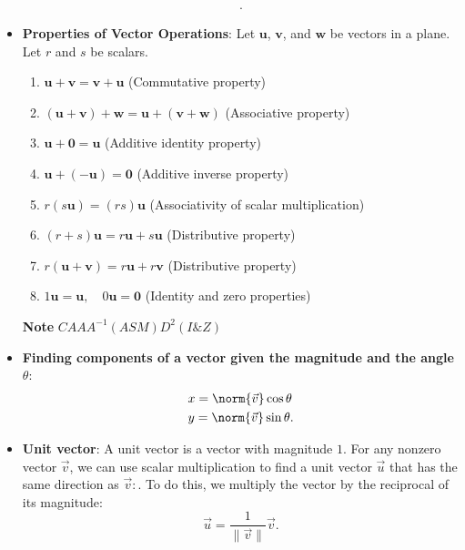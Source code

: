 \documentclass{report}
\begin{document}
\begin{itemize}
\begin{align*}
        .\end{align*}
    \item \textbf{Properties of Vector Operations}:
        Let $\mathbf{u}$, $\mathbf{v}$, and $\mathbf{w}$ be vectors in a plane. Let $r$ and $s$ be scalars.
        \begin{enumerate}
            \item $\mathbf{u} + \mathbf{v} = \mathbf{v} + \mathbf{u}$ \quad (Commutative property)
            \item $(\mathbf{u} + \mathbf{v}) + \mathbf{w} = \mathbf{u} + (\mathbf{v} + \mathbf{w})$ \quad (Associative property)
            \item $\mathbf{u} + \mathbf{0} = \mathbf{u}$ \quad (Additive identity property)
            \item $\mathbf{u} + (-\mathbf{u}) = \mathbf{0}$ \quad (Additive inverse property)
            \item $r(s\mathbf{u}) = (rs)\mathbf{u}$ \quad (Associativity of scalar multiplication)
            \item $(r + s)\mathbf{u} = r\mathbf{u} + s\mathbf{u}$ \quad (Distributive property)
            \item $r(\mathbf{u} + \mathbf{v}) = r\mathbf{u} + r\mathbf{v}$ \quad (Distributive property)
            \item $1\mathbf{u} = \mathbf{u}, \quad 0\mathbf{u} = \mathbf{0}$ \quad (Identity and zero properties)
        \end{enumerate}
        \textbf{Note} $CAAA^{-1}(ASM)D^{2}(I\&Z)$
    \item \textbf{Finding components of a vector given the magnitude and the angle $\theta$}:
        \begin{align*}
            &x = \norm{\vec{v}}\cos{\theta } \\
            &y = \norm{\vec{v}}\sin{\theta }
        .\end{align*}
    \item \textbf{Unit vector}: A unit vector is a vector with magnitude $1$. For any nonzero vector $\vec{v}$, we can use scalar multiplication to find a unit vector $\vec{u}$ that has the same direction as $\vec{v}:$. To do this, we multiply the vector by the reciprocal of its magnitude:
        \[
            \vec{u} = \frac{1}{\lVert \vec{v} \rVert} \vec{v}.
        \]


\end{itemize}
\end{document}
